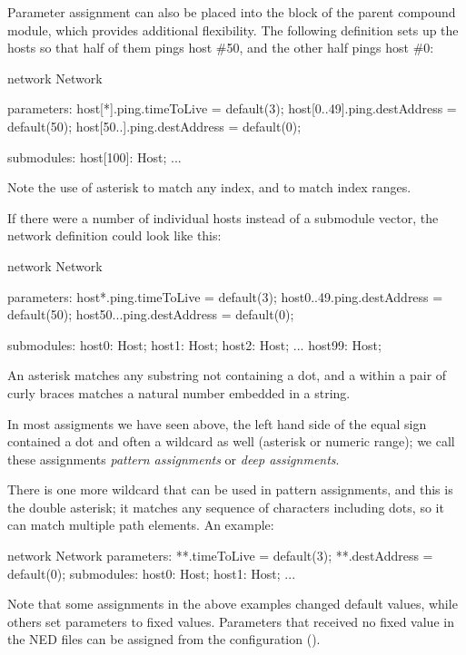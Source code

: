 Parameter assignment can also be placed into the  block of
the parent compound module, which provides additional flexibility. The
following definition sets up the hosts so that half of them pings host \#50,
and the other half pings host \#0:

\begin{ned}
network Network
{
    parameters:
        host[*].ping.timeToLive = default(3);
        host[0..49].ping.destAddress = default(50);
        host[50..].ping.destAddress = default(0);

    submodules:
        host[100]: Host;
        ...
}
\end{ned}

Note the use of asterisk to match any index, and  to match index ranges.

If there were a number of individual hosts instead of a submodule vector,
the network definition could look like this:

\begin{ned}
network Network
{
    parameters:
        host*.ping.timeToLive = default(3);
        host{0..49}.ping.destAddress = default(50);
        host{50..}.ping.destAddress = default(0);

    submodules:
        host0: Host;
        host1: Host;
        host2: Host;
        ...
        host99: Host;
}
\end{ned}

An asterisk matches any substring not containing a dot, and a 
within a pair of curly braces matches a natural number embedded in a
string.

In most assigments we have seen above, the left hand side of the equal sign
contained a dot and often a wildcard as well (asterisk or numeric range);
we call these assignments \textit{pattern assignments} or \textit{deep
assignments}.

There is one more wildcard that can be used in pattern assignments, and
this is the double asterisk; it matches any sequence of characters
including dots, so it can match multiple path elements. An example:

\begin{ned}
network Network
{
    parameters:
        **.timeToLive = default(3);
        **.destAddress = default(0);
    submodules:
        host0: Host;
        host1: Host;
        ...
}
\end{ned}

Note that some assignments in the above examples changed default values,
while others set parameters to fixed values. Parameters that received no
fixed value in the NED files can be assigned from the configuration
().

